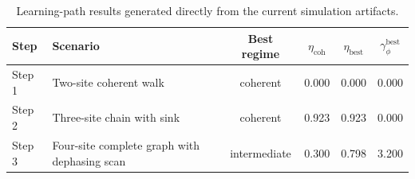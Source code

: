\begin{table}[t]
\centering
\caption{Learning-path results generated directly from the current simulation artifacts.}
\begin{tabular}{llcccc}
\toprule
Step & Scenario & Best regime & $\eta_{\mathrm{coh}}$ & $\eta_{\mathrm{best}}$ & $\gamma_{\phi}^{\mathrm{best}}$ \\
\midrule
Step 1 & Two-site coherent walk & coherent & 0.000 & 0.000 & 0.000 \\
Step 2 & Three-site chain with sink & coherent & 0.923 & 0.923 & 0.000 \\
Step 3 & Four-site complete graph with dephasing scan & intermediate & 0.300 & 0.798 & 3.200 \\
\bottomrule
\end{tabular}
\end{table}
